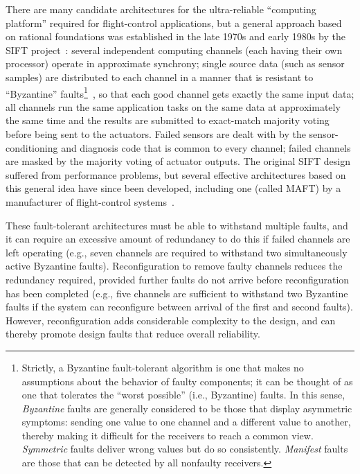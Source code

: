 There are many candidate architectures for the ultra-reliable
``computing platform'' required for flight-control applications, but
a general approach based on rational foundations was established in
the late 1970s and early 1980s by the SIFT
project~\cite{SIFT-design}: several independent computing channels
(each having their own processor) operate in approximate synchrony;
single source data (such as sensor samples) are distributed to each
channel in a manner that is resistant to ``Byzantine''
faults\footnote{Strictly, a Byzantine fault-tolerant algorithm is one
that makes no assumptions about the behavior of faulty components; it
can be thought of as one that tolerates the ``worst possible'' (i.e.,
Byzantine) faults.  In this sense, {\em Byzantine\/} faults are
generally considered to be those that display asymmetric symptoms:
sending one value to one channel and a different value to another,
thereby making it difficult for the receivers to reach a common view.
{\em Symmetric\/} faults deliver wrong values but do so consistently.
{\em Manifest\/} faults are those that can be detected by all
nonfaulty receivers.}~\cite{Pease}, so that each good channel gets
exactly the same input data; all channels run the same application
tasks on the same data at approximately the same time and the results
are submitted to exact-match majority voting before being sent to the
actuators.  Failed sensors are dealt with by the sensor-conditioning
and diagnosis code that is common to every channel; failed channels
are masked by the majority voting of actuator outputs.  The original
SIFT design suffered from performance problems, but several effective
architectures based on this general idea have since been developed,
including one (called MAFT) by a manufacturer of flight-control
systems~\cite{MAFT}.

These fault-tolerant architectures must be able to withstand multiple
faults, and it can require an excessive amount of redundancy to do
this if failed channels are left operating (e.g., seven channels are
required to withstand two simultaneously active Byzantine faults).
Reconfiguration to remove faulty channels reduces the redundancy
required, provided further faults do not arrive before
reconfiguration has been completed (e.g., five channels are
sufficient to withstand two Byzantine faults if the system can
reconfigure between arrival of the first and second faults).
However, reconfiguration adds considerable complexity to the design,
and can thereby promote design faults that reduce overall
reliability.

